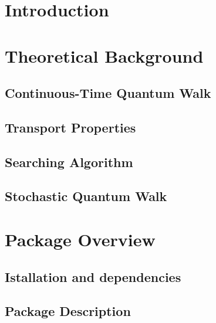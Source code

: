 \documentclass[preprint,12pt]{elsarticle}
\begin{document}
\section{Introduction}
    


\section{Theoretical Background}\label{sec:theor_background}
    
    \subsection{Continuous-Time Quantum Walk}
        
    \subsection{Transport Properties}
        
        
    \subsection{Searching Algorithm}
        \label{sec:theor_searching}
    \subsection{Stochastic Quantum Walk}
        

\section{Package Overview}\label{sec:pack_overview}
    
    \subsection{Istallation and dependencies}
        
    \subsection{Package Description}
        \label{sec:OverviewDescription}
\end{document}
